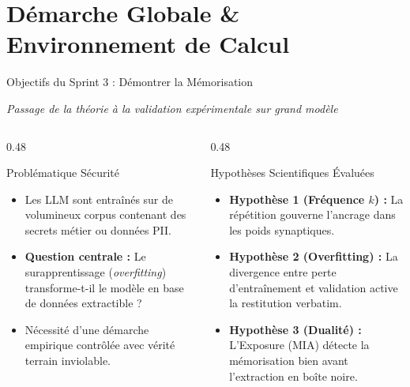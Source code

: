 \documentclass[aspectratio=169, 10pt, table]{beamer}
\newcommand{\subtitleline}[1]{{\small\itshape\color{TSPcyan}#1\par}\vspace{0.15cm}}
\begin{document}
\begin{frame}[plain]
    \titlepage
\end{frame}

\section{Démarche Globale \& Environnement de Calcul}

\begin{frame}{Objectifs du Sprint 3 : Démontrer la Mémorisation}
    \subtitleline{Passage de la théorie à la validation expérimentale sur grand modèle}
    \begin{columns}[T]
        \begin{column}{0.48\textwidth}
            \begin{block}{Problématique Sécurité}
                \begin{itemize}
                    \item Les LLM sont entraînés sur de volumineux corpus contenant des secrets métier ou données PII.
                    \item \textbf{Question centrale :} Le surapprentissage (\textit{overfitting}) transforme-t-il le modèle en base de données extractible ?
                    \item Nécessité d'une démarche empirique contrôlée avec vérité terrain inviolable.
                \end{itemize}
            \end{block}
        \end{column}
        \begin{column}{0.48\textwidth}
            \begin{alertblock}{Hypothèses Scientifiques Évaluées}
                \begin{itemize}
                    \item \textbf{Hypothèse 1 (Fréquence $k$) :} La répétition gouverne l'ancrage dans les poids synaptiques.
                    \item \textbf{Hypothèse 2 (Overfitting) :} La divergence entre perte d'entraînement et validation active la restitution verbatim.
                    \item \textbf{Hypothèse 3 (Dualité) :} L'Exposure (MIA) détecte la mémorisation bien avant l'extraction en boîte noire.
                \end{itemize}
            \end{alertblock}
        \end{column}
    \end{columns}
\end{frame}
\end{document}
